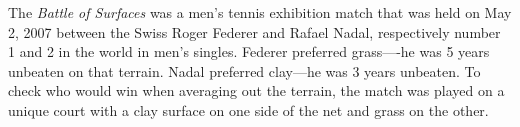 The \emph{Battle of Surfaces} was a men's tennis exhibition match that was held on May 2, 2007 between the Swiss Roger Federer and Rafael Nadal, respectively
number 1 and 2 in the world in men's singles. Federer preferred grass----he was 5 years unbeaten on that terrain. Nadal preferred clay---he was 3 years unbeaten.
To check who would win when averaging out the terrain, the match was played on a unique court with a clay surface on one side of the net and grass on the other.
